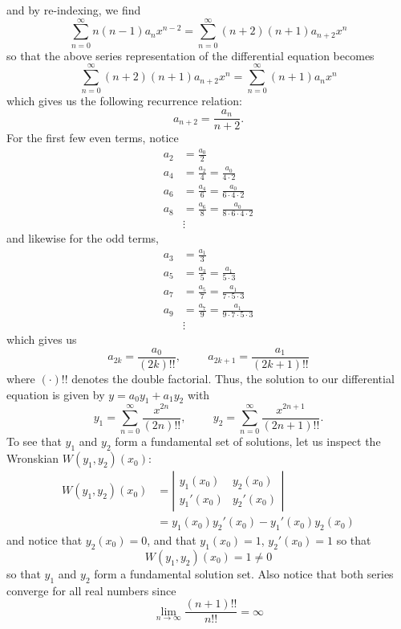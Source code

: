 \documentclass{article}
\begin{document}
\begin{itemize}
\begin{itemize}
        and by re-indexing, we find
        \[\sum_{n = 0}^{\infty}n(n-1)a_nx^{n-2} = \sum_{n = 0}^{\infty}(n+2)(n+1)a_{n+2}x^n\]
        so that the above series representation of the differential equation becomes
        \[\sum_{n = 0}^{\infty}(n+2)(n+1)a_{n+2}x^n = \sum_{n = 0}^{\infty} (n+1)a_nx^n\]
        which gives us the following recurrence relation:
        \[a_{n+2} = \frac{a_n}{n+2}.\]
        For the first few even terms, notice
        \begin{align*}
            a_2 &= \frac{a_0}{2}\\
            a_4 &= \frac{a_2}{4} = \frac{a_0}{4\cdot 2}\\
            a_6 &= \frac{a_4}{6} = \frac{a_0}{6\cdot 4 \cdot 2}\\
            a_8 &= \frac{a_6}{8} = \frac{a_0}{8 \cdot 6 \cdot 4 \cdot 2}\\
            &\vdots
        \end{align*}
        and likewise for the odd terms,
        \begin{align*}
            a_3 &= \frac{a_1}{3}\\
            a_5 &= \frac{a_3}{5} = \frac{a_1}{5\cdot 3}\\
            a_7 &= \frac{a_5}{7} = \frac{a_1}{7 \cdot 5 \cdot 3}\\
            a_9 &= \frac{a_7}{9} = \frac{a_1}{9 \cdot 7 \cdot 5 \cdot 3}\\
            &\vdots
        \end{align*}
        which gives us 
        \[a_{2k} = \frac{a_0}{(2k)!!}, \hspace{1cm} a_{2k+1} = \frac{a_1}{(2k + 1)!!}\]
        where $(\cdot)!!$ denotes the double factorial. Thus, the solution to our differential equation is given by $y = a_0y_1 + a_1y_2$ with
        \[y_1 = \sum_{n = 0}^{\infty} \frac{x^{2n}}{(2n)!!}, \hspace{1cm} y_2 = \sum_{n = 0}^{\infty} \frac{x^{2n+1}}{(2n+1)!!}.\]
        To see that $y_1$ and $y_2$ form a fundamental set of solutions, let us inspect the Wronskian $W(y_1,y_2)(x_0)$:
        \begin{align*}
            W(y_1,y_2)(x_0) &= \left|\begin{matrix}
                y_1(x_0) & y_2(x_0)\\
                y_1'(x_0) & y_2'(x_0)
            \end{matrix}\right|\\
            &= y_1(x_0)y_2'(x_0) - y_1'(x_0)y_2(x_0)
        \end{align*}
        and notice that $y_2(x_0) = 0$, and that $y_1(x_0) = 1$, $y_2'(x_0) = 1$ so that
        \[W(y_1,y_2)(x_0) = 1 \neq 0\]
        so that $y_1$ and $y_2$ form a fundamental solution set. Also notice that both series converge for all real numbers since
        \[\lim_{n \to \infty} \frac{(n + 1)!!}{n!!} = \infty\]


\end{itemize}
\end{itemize}
\end{document}

